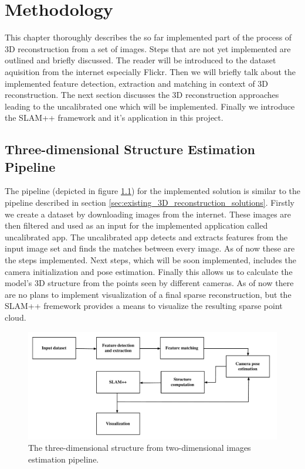 \chapter{Methodology}
\label{chapter:methodology}
This chapter thoroughly describes the so far implemented part of the process of 3D reconstruction from a set of images. Steps that are not yet implemented are outlined and briefly discussed. The reader will be introduced to the dataset aquisition from the internet especially Flickr. Then we will briefly talk about the implemented feature detection, extraction and matching in context of 3D reconstruction. The next section discusses the 3D reconstruction approaches leading to the uncalibrated one which will be implemented. Finally we introduce the SLAM++ framework and it's application in this project. 

\section{Three-dimensional Structure Estimation Pipeline}
The pipeline (depicted in figure \ref{fig:pipeline}) for the implemented solution is similar to the pipeline described in section \ref{sec:existing_3D_reconstruction_solutions}. Firstly we create a dataset by downloading images from the internet. These images are then filtered and used as an input for the implemented application called uncalibrated app. The uncalibrated app detects and extracts features from the input image set and finds the matches between every image. As of now these are the steps implemented. Next steps, which will be soon implemented, includes the camera initialization and pose estimation. Finally this allows us to calculate the model's 3D structure from the points seen by different cameras. As of now there are no plans to implement visualization of a final sparse reconstruction, but the SLAM++ fremework provides a means to visualize the resulting sparse point cloud. 

\begin{figure}[ht]
	\begin{center}
		\includegraphics[keepaspectratio,width=\textwidth]{fig/pipeline.pdf}
	\end{center}
	\caption{The three-dimensional structure from two-dimensional images estimation pipeline.}
	\label{fig:pipeline}
\end{figure}

